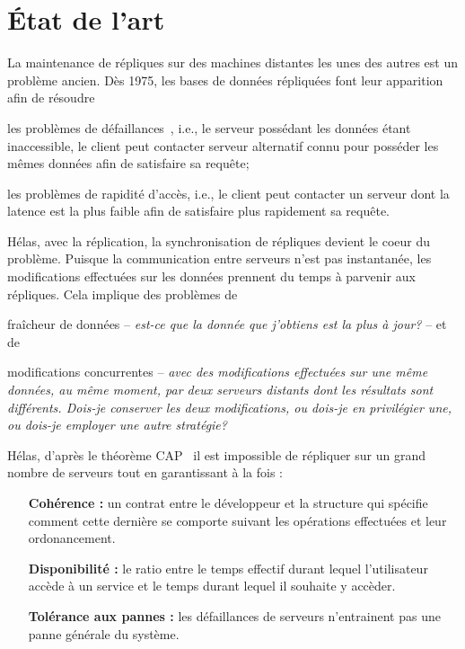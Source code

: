 

\section{État de l'art}
\label{repl:sec:stateoftheart}

La maintenance de répliques sur des machines distantes les unes des
autres est un problème ancien. Dès 1975, les bases de données répliquées font
leur apparition~\cite{johnson1975maintenance} afin de résoudre
\begin{inparaenum}[(i)]
\item les problèmes de défaillances~\cite{alsberg1976principle}, i.e., le
  serveur possédant les données étant inaccessible, le client peut contacter
  serveur alternatif connu pour posséder les mêmes données afin de satisfaire sa
  requête;
\item les problèmes de rapidité d'accès, i.e., le client peut contacter un
  serveur dont la latence est la plus faible afin de satisfaire plus rapidement
  sa requête.
\end{inparaenum}

Hélas, avec la réplication, la synchronisation de répliques devient le coeur du
problème. Puisque la communication entre serveurs n'est pas instantanée, les
modifications effectuées sur les données prennent du temps à parvenir aux
répliques. Cela implique des problèmes de
\begin{inparaenum}[(i)]
\item fraîcheur de données -- \emph{est-ce que la donnée que j'obtiens est la
    plus à jour?} -- et de
\item modifications concurrentes -- \emph{avec des modifications effectuées sur
    une même données, au même moment, par deux serveurs distants dont les
    résultats sont différents. Dois-je conserver les deux modifications, ou
    dois-je en privilégier une, ou dois-je employer une autre stratégie?}
\end{inparaenum}


Hélas, d'après le théorème CAP~\cite{gilbert2002brewer} il est impossible de
répliquer sur un grand nombre de serveurs tout en garantissant à la fois :
\begin{itemize}
\item [\textbf{Cohérence :}] un contrat entre le développeur et la structure qui
  spécifie comment cette dernière se comporte suivant les opérations effectuées
  et leur ordonancement.
\item [\textbf{Disponibilité :}] le ratio entre le temps effectif durant lequel
  l'utilisateur accède à un service et le temps durant lequel il souhaite y
  accèder.
\item [\textbf{Tolérance aux pannes :}] les défaillances de serveurs
  n'entrainent pas une panne générale du système.
\end{itemize}

